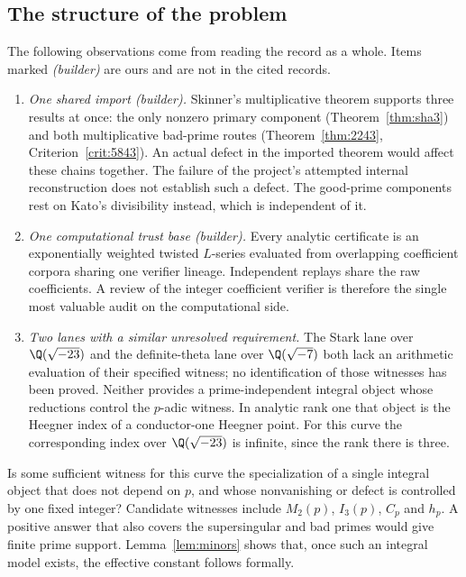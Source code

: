 \subsection{The structure of the problem}
The following observations come from reading the record as a whole. Items marked \emph{(builder)} are ours and are not in the cited records.

\begin{enumerate}[label=(\alph*),leftmargin=*]
\item \emph{One shared import (builder).} Skinner's multiplicative theorem supports three results at once: the only nonzero primary component (Theorem~\ref{thm:sha3}) and both multiplicative bad-prime routes (Theorem~\ref{thm:2243}, Criterion~\ref{crit:5843}). An actual defect in the imported theorem would affect these chains together. The failure of the project's attempted internal reconstruction does not establish such a defect. The good-prime components rest on Kato's divisibility instead, which is independent of it.

\item \emph{One computational trust base (builder).} Every analytic certificate is an exponentially weighted twisted $L$-series evaluated from overlapping coefficient corpora sharing one verifier lineage. Independent replays share the raw coefficients. A review of the integer coefficient verifier is therefore the single most valuable audit on the computational side.

\item \emph{Two lanes with a similar unresolved requirement.} The Stark lane over $\Q(\sqrt{-23})$ and the definite-theta lane over $\Q(\sqrt{-7})$ both lack an arithmetic evaluation of their specified witness; no identification of those witnesses has been proved. Neither provides a prime-independent integral object whose reductions control the $p$-adic witness. In analytic rank one that object is the Heegner index of a conductor-one Heegner point. For this curve the corresponding index over $\Q(\sqrt{-23})$ is infinite, since the rank there is three.
\end{enumerate}

\begin{question}[\cid{O.4}]\label{q:uniform}
Is some sufficient witness for this curve the specialization of a single integral object that does not depend on $p$, and whose nonvanishing or defect is controlled by one fixed integer? Candidate witnesses include $M_2(p)$, $I_3(p)$, $C_p$ and $h_p$. A positive answer that also covers the supersingular and bad primes would give finite prime support. Lemma~\ref{lem:minors} shows that, once such an integral model exists, the effective constant follows formally.
\end{question}

